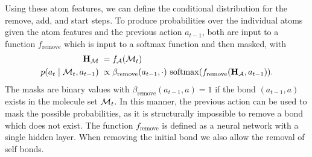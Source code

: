 Using these atom features, we can define the conditional distribution for the remove, add, and start steps.
To produce probabilities over the individual atoms given the atom features and the previous action $a_{t-1}$,
both are input to a function $f_{\textrm{remove}}$ which is input to a softmax function and then masked, with
\begin{align}
{\mathbf{H}}_{{\mathcal{M}}} \;&= f_{{\mathcal{A}}}({\mathcal{M}}_t) \label{eq:rem_atom} \\
p(a_t \mid {\mathcal{M}}_{t}, a_{t-1}) 
\;&\propto \beta_{\mathrm{remove}}(a_{t-1}, \cdot) \  \mathrm{softmax}(f_{\textrm{remove}}({\mathbf{H}}_{{\mathcal{A}}}, a_{t-1})). \label{eq:rem_prob}
\end{align}
The masks are binary values with $\beta_{\mathrm{remove}}({a_{t-1}, a}) = 1$ if the bond $(a_{t-1}, a)$ exists in the molecule set ${\mathcal{M}}_t$.
In this manner, the previous action can be used to mask the possible probabilities, as it is structurally impossible to remove a bond which does not exist.
The function $f_{\textrm{remove}}$ is defined as a neural network with a single hidden layer.
When removing the initial bond we also allow the removal of self bonds.


%
%

